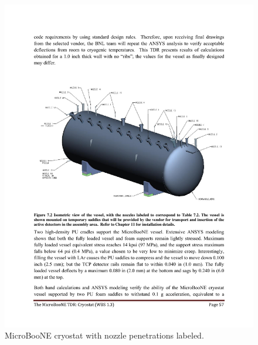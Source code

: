 \begin{figure}[htb]
\centering	
\includegraphics[width=\linewidth]{figures/cryostat_nozzles}
\caption{MicroBooNE cryostat with nozzle penetrations labeled.}
\label{fig:cryostat-drawing}
\end{figure}

